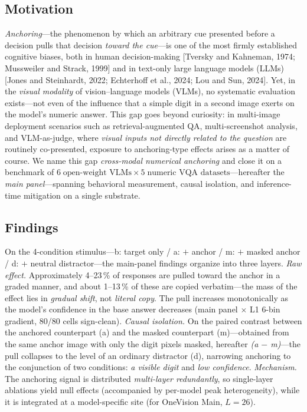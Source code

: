 \documentclass[11pt]{article}
\begin{document}
\subsection{Motivation}
\textit{Anchoring}---the phenomenon by which an arbitrary cue presented before a decision pulls that decision \textit{toward the cue}---is one of the most firmly established cognitive biases, both in human decision-making [Tversky and Kahneman, 1974; Mussweiler and Strack, 1999] and in text-only large language models (LLMs) [Jones and Steinhardt, 2022; Echterhoff et al., 2024; Lou and Sun, 2024]. Yet, in the \textit{visual modality} of vision--language models (VLMs), no systematic evaluation exists---not even of the influence that a simple digit in a second image exerts on the model's numeric answer. This gap goes beyond curiosity: in multi-image deployment scenarios such as retrieval-augmented QA, multi-screenshot analysis, and VLM-as-judge, where \textit{visual inputs not directly related to the question} are routinely co-presented, exposure to anchoring-type effects arises as a matter of course. We name this gap \textit{cross-modal numerical anchoring} and close it on a benchmark of $6\;\text{open-weight VLMs}\times 5\;\text{numeric VQA datasets}$---hereafter the \textit{main panel}---spanning behavioral measurement, causal isolation, and inference-time mitigation on a single substrate.

\subsection{Findings}
On the 4-condition stimulus---b: target only / a: $+$ anchor / m: $+$ masked anchor / d: $+$ neutral distractor---the main-panel findings organize into three layers. \textit{Raw effect.} Approximately 4--23\,\% of responses are pulled toward the anchor in a graded manner, and about 1--13\,\% of these are copied verbatim---the mass of the effect lies in \textit{gradual shift}, not \textit{literal copy}. The pull increases monotonically as the model's confidence in the base answer decreases (main panel $\times$ L1 6-bin gradient, 80/80 cells sign-clean). \textit{Causal isolation.} On the paired contrast between the anchored counterpart (a) and the masked counterpart (m)---obtained from the same anchor image with only the digit pixels masked, hereafter \textit{(a $-$ m)}---the pull collapses to the level of an ordinary distractor (d), narrowing anchoring to the conjunction of two conditions: \textit{a visible digit} and \textit{low confidence}. \textit{Mechanism.} The anchoring signal is distributed \textit{multi-layer redundantly}, so single-layer ablations yield null effects (accompanied by per-model peak heterogeneity), while it is integrated at a model-specific site (for OneVision Main, $L=26$).
\end{document}

